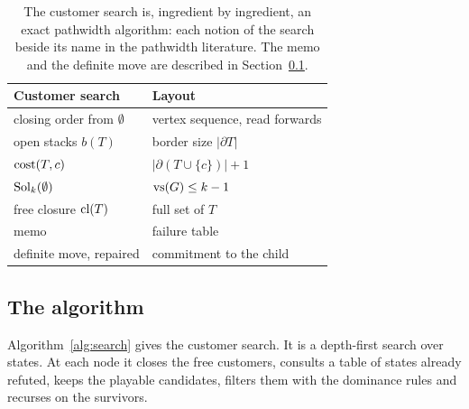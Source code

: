 \begin{table}[t]
\centering\small
\caption{The customer search is, ingredient by ingredient, an exact pathwidth
algorithm: each notion of the search beside its name in the pathwidth
literature. The memo and the definite move are described in
Section~\ref{sec:algorithm}.}
\label{tab:dictionary}
\begin{tabularx}{\linewidth}{@{}>{\raggedright}p{5.2cm}>{\raggedright\arraybackslash}X@{}}
\toprule
Customer search & Layout \\
\midrule
closing order from $\emptyset$ & vertex sequence, read forwards \\
open stacks $b(T)$ & border size $|\partial T|$ \\
$\mathrm{cost}(T,c)$ & $|\partial(T\cup\{c\})|+1$ \\
$\mathrm{Sol}_k(\emptyset)$ & $\mathrm{vs}(G)\le k-1$ \\
free closure $\mathrm{cl}(T)$ & full set of $T$ \citep[p.~328]{SuchanVillanger2009} \\
memo & failure table \\
definite move, repaired & commitment to the child \\
\bottomrule\end{tabularx}
\end{table}

\subsection{The algorithm}
\label{sec:algorithm}

Algorithm~\ref{alg:search} gives the customer search. It is a depth-first
search over states. At each node it closes the free customers, consults a
table of states already refuted, keeps the playable candidates, filters them
with the dominance rules and recurses on the survivors.

